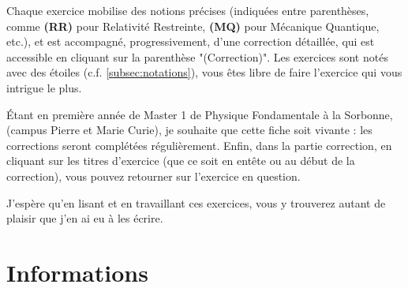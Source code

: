 \documentclass[a4paper,10pt]{report}
\begin{document}
	Chaque exercice mobilise des notions précises (indiquées entre parenthèses, comme \textbf{(RR)} pour Relativité Restreinte, \textbf{(MQ)} pour Mécanique Quantique, etc.), et est accompagné, progressivement, d'une correction détaillée, qui est accessible en cliquant sur la parenthèse "(Correction)". Les exercices sont notés avec des étoiles (c.f. \ref{subsec:notations}), vous êtes libre de faire l'exercice qui vous intrigue le plus.
	
	 Étant en première année de Master 1 de Physique Fondamentale à la Sorbonne, (campus Pierre et Marie Curie), je souhaite que cette fiche soit vivante : les corrections seront complétées régulièrement. Enfin, dans la partie correction, en cliquant sur les titres d'exercice (que ce soit en entête ou au début de la correction), vous pouvez retourner sur l'exercice en question.
	
	J’espère qu’en lisant et en travaillant ces exercices, vous y trouverez autant de plaisir que j’en ai eu à les écrire.

		\chapter{Informations}\label{section:info}
\end{document}
